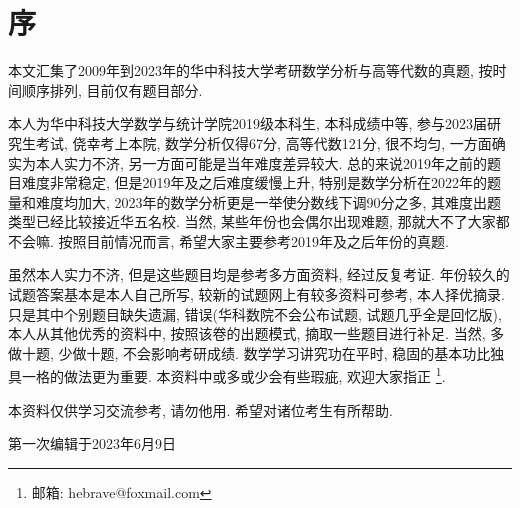 \documentclass[12pt, a4paper, twoside]{ctexart}%
\begin{document}
\indent%

\setlength{\abovedisplayskip}{2pt}
\setlength{\belowdisplayskip}{2pt}
\setlength{\abovedisplayshortskip}{2pt}
\setlength{\belowdisplayshortskip}{2pt}
	\begin{spacing}{1.5}
		\begin{center}
			\vspace{1.5cm}{\Huge 华中科技大学\\
				数学与统计学院考研资料\\
				高等代数与高等代数\\}
			\vspace{2cm}{\Large 23届本科生\quad 何七百}
		\end{center}
	\end{spacing}
	\thispagestyle{empty}
	\clearpage
	\section*{序}
{	\setlength{\parindent}{2em}%
本文汇集了2009年到2023年的华中科技大学考研数学分析与高等代数的真题, 按时间顺序排列, 目前仅有题目部分. \par
本人为华中科技大学数学与统计学院2019级本科生, 本科成绩中等, 参与2023届研究生考试, 侥幸考上本院, 数学分析仅得67分, 高等代数121分, 很不均匀, 一方面确实为本人实力不济, 另一方面可能是当年难度差异较大. 总的来说2019年之前的题目难度非常稳定, 但是2019年及之后难度缓慢上升, 特别是数学分析在2022年的题量和难度均加大, 2023年的数学分析更是一举使分数线下调90分之多, 其难度出题类型已经比较接近华五名校. 当然, 某些年份也会偶尔出现难题, 那就大不了大家都不会嘛. 按照目前情况而言, 希望大家主要参考2019年及之后年份的真题. \par 
虽然本人实力不济, 但是这些题目均是参考多方面资料, 经过反复考证. 年份较久的试题答案基本是本人自己所写, 较新的试题网上有较多资料可参考, 本人择优摘录. 只是其中个别题目缺失遗漏, 错误(华科数院不会公布试题, 试题几乎全是回忆版), 本人从其他优秀的资料中, 按照该卷的出题模式, 摘取一些题目进行补足. 当然, 多做十题, 少做十题, 不会影响考研成绩. 数学学习讲究功在平时, 稳固的基本功比独具一格的做法更为重要. 本资料中或多或少会有些瑕疵, 欢迎大家指正 {\footnotesize \footnote{邮箱: hebrave@foxmail.com}}.\par 
本资料仅供学习交流参考, 请勿他用. 希望对诸位考生有所帮助. \par
\begin{flushright}
	第一次编辑于2023年6月9日\\
\end{flushright}
}
\thispagestyle{empty}
\clearpage
	\clearpage
	\setcounter{page}{1}
\end{document}
